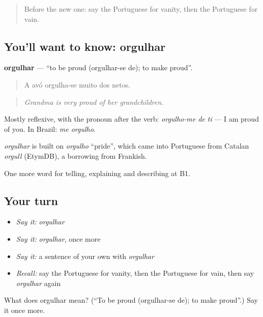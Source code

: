 \begin{quote}
Before the new one: say the Portuguese for vanity, then the Portuguese for vain.
\end{quote}

\subsection*{You'll want to know: orgulhar}
\textbf{orgulhar} — \textquotedblleft{}to be proud (orgulhar-se de); to make proud\textquotedblright{}.

\begin{quote}
A avó orgulha-se muito dos netos.
\end{quote}

\begin{quote}
\emph{Grandma is very proud of her grandchildren.}
\end{quote}

Mostly reflexive, with the pronoun after the verb: \emph{orgulho-me de ti} — I am proud of you. In Brazil: \emph{me orgulho}.

\begin{cousinweb}
\emph{orgulhar} is built on \emph{orgulho} \textquotedblleft{}pride\textquotedblright{}, which came into Portuguese from Catalan \emph{orgull} (EtymDB), a borrowing from Frankish.
\end{cousinweb}

\begin{grammarlens}[title={What you've built}]
One more word for telling, explaining and describing at B1.
\end{grammarlens}

\subsection*{Your turn}
\begin{itemize}
\raggedright
  \item \emph{Say it:} \emph{orgulhar}
  \item \emph{Say it:} \emph{orgulhar}, once more
  \item \emph{Say it:} a sentence of your own with \emph{orgulhar}
  \item \emph{Recall:} say the Portuguese for vanity, then the Portuguese for vain, then say \emph{orgulhar} again
\end{itemize}

\begin{tcolorbox}[breakable,colback=teal!4,colframe=teal!35!black,title={Before you move on}]
What does orgulhar mean? (\textquotedblleft{}To be proud (orgulhar-se de); to make proud\textquotedblright{}.) Say it once more.
\end{tcolorbox}
